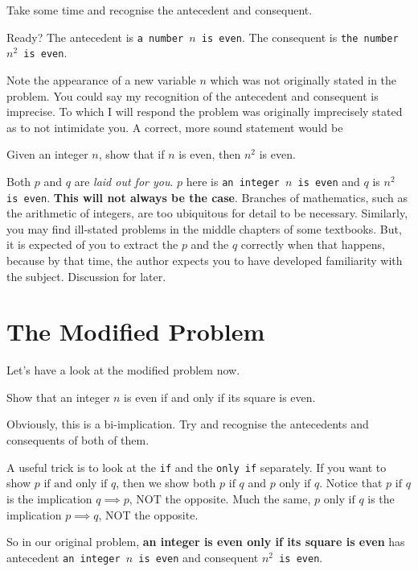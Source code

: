 Take some time and recognise the antecedent and consequent.

Ready? The antecedent is \texttt{a number $n$ is even}. The consequent is \texttt{the number $n^2$ is even}.

Note the appearance of a new variable $n$ which was not originally stated in the problem. You could say my recognition of the antecedent and consequent is imprecise. To which I will respond the problem was originally imprecisely stated as to not intimidate you.
\newpage
A correct, more sound statement would be
\begin{SNP}{\xmp}Given an integer $n$, show that if $n$ is even, then $n^2$ is even.
\end{SNP}

Both $p$ and $q$ are \textit{laid out for you}. $p$ here is \texttt{an integer $n$ is even} and $q$ is \texttt{$n^2$ is even}. \textbf{This will not always be the case}. Branches of mathematics, such as the arithmetic of integers, are too ubiquitous for detail to be necessary. Similarly, you may find ill-stated problems in the middle chapters of some textbooks. But, it is expected of you to extract the $p$ and the $q$ correctly when that happens, because by that time, the author expects you to have developed familiarity with the subject. Discussion for later.

\section*{The Modified Problem}
Let's have a look at the modified problem now.
\begin{SNP}{\prb}Show that an integer $n$ is even if and only if its square is even.
\end{SNP}

Obviously, this is a bi-implication. Try and recognise the antecedents and consequents of both of them.

A useful trick is to look at the \texttt{if} and the \texttt{only if} separately. If you want to show $p \text{ if and only if } q$, then we show both $p \text{ if } q$ and $p \text{ only if } q$. Notice that $p \text{ if } q$ is the implication $q \implies p$, NOT the opposite. Much the same, $p \text{ only if } q$ is the implication $p \implies q$, NOT the opposite.

So in our original problem, \textbf{an integer is even only if its square is even} has antecedent \texttt{an integer $n$ is even} and consequent \texttt{$n^2$ is even}.

